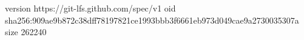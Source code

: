 version https://git-lfs.github.com/spec/v1
oid sha256:909ae9b872c38dff78197821ce1993bbb3f6661eb973d049cae9a2730035307a
size 262240
